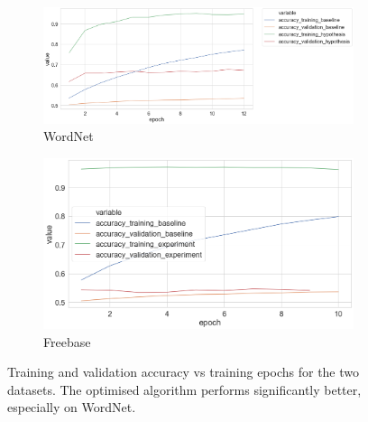 \begin{figure}[H]
	\begin{subfigure}[b]{.5\linewidth}
   		\centering
    		\includegraphics[width=1.0\linewidth, height=0.6\linewidth]{Wordnet_Accuracy_Results_Early_Stopping}
		\captionsetup{justification=centering}
		\caption{WordNet}
	\end{subfigure}
	\begin{subfigure}[b]{.5\linewidth}
   		\centering
		\includegraphics[width=1.0\linewidth, height=0.6\linewidth]{Freebase_Accuracy_Results}
		\captionsetup{justification=centering}
		\caption{Freebase}
	\end{subfigure}
	\captionsetup{justification=centering}
	\caption{Training and validation accuracy vs training epochs for the two datasets. The optimised algorithm performs significantly better, especially on WordNet.}
\end{figure}

